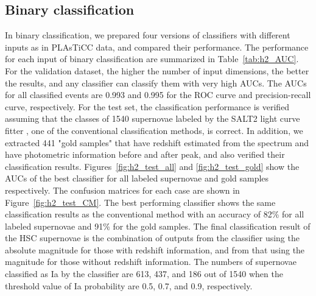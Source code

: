 \documentclass[useamsfonts]{pasj01}
\begin{document}
\subsection{Binary classification}
\label{sec:h2}
%
In binary classification, we prepared four versions of classifiers with different inputs as in PLAsTiCC data, and compared their performance.
The performance for each input of binary classification are summarized in Table\ \ref{tab:h2_AUC}.
For the validation dataset, the higher the number of input dimensions, the better the results, and any classifier can classify them with very high AUCs.
The AUCs for all classified events are 0.993 and 0.995 for the ROC curve and precision-recall curve, respectively.
For the test set, the classification performance is verified assuming that the classes of 1540 supernovae labeled by the SALT2 light curve fitter \citep{guy2007}, one of the conventional classification methods, is correct.
In addition, we extracted 441 "gold samples" that have redshift estimated from the spectrum and have photometric information before and after peak, and also verified their classification results.
Figures\ \ref{fig:h2_test_all} and \ref{fig:h2_test_gold} show the AUCs of the best classifier for all labeled supernovae and gold samples respectively.
The confusion matrices for each case are shown in Figure\ \ref{fig:h2_test_CM}.
The best performing classifier shows the same classification results as the conventional method with an accuracy of 82\% for all labeled supernovae and 91\% for the gold samples.
The final classification result of the HSC supernovae is the combination of outputs from the classifier using the absolute magnitude for those with redshift information, and from that using the magnitude for those without redshift information.
The numbers of supernovae classified as Ia by the classifier are 613, 437, and 186 out of 1540 when the threshold value of Ia probability are 0.5, 0.7, and 0.9, respectively.
%
%
%
%
\end{document}
